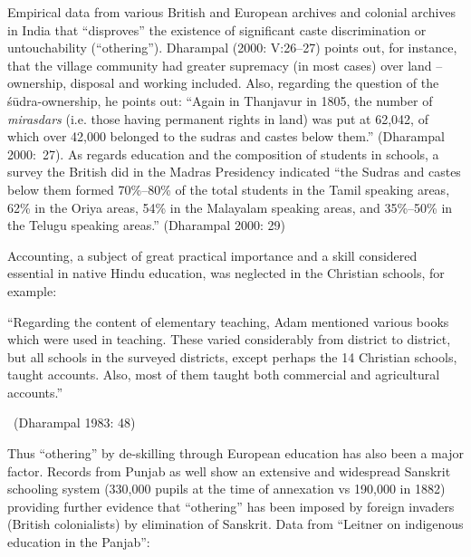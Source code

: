 Empirical data from various British and European archives and colonial archives in India that “disproves” the existence of significant caste discrimination or untouchability (“othering”). Dharampal (2000: V:26–27) points out, for instance, that the village community had greater supremacy (in most cases) over land – ownership, disposal and working included. Also, regarding the question of the śūdra-ownership, he points out: “Again in Thanjavur in 1805, the number of \textit{mirasdars} (i.e. those having permanent rights in land) was put at 62,042, of which over 42,000 belonged to the sudras and castes below them.” (Dharampal 2000:~27). As regards education and the composition of students in schools, a survey the British did in the Madras Presidency indicated “the Sudras and castes below them formed 70\%–80\% of the total students in the Tamil speaking areas, 62\% in the Oriya areas, 54\% in the Malayalam speaking areas, and 35\%–50\% in the Telugu speaking areas.” (Dharampal 2000: 29)

Accounting, a subject of great practical importance and a skill considered essential in native Hindu education, was neglected in the Christian schools, for example:

\eject

\begin{myquote}
“Regarding the content of elementary teaching, Adam mentioned various books which were used in teaching. These varied considerably from district to district, but all schools in the surveyed districts, except perhaps the 14 Christian schools, taught accounts. Also, most of them taught both commercial and agricultural accounts.” 

~\hfill (Dharampal 1983: 48)
\end{myquote}

Thus “othering” by de-skilling through European education has also been a major factor. Records from Punjab as well show an extensive and widespread Sanskrit schooling system (330,000 pupils at the time of annexation vs 190,000 in 1882) providing further evidence that “othering” has been imposed by foreign invaders (British colonialists) by elimination of Sanskrit. Data from “Leitner on indigenous education in the Panjab”:

